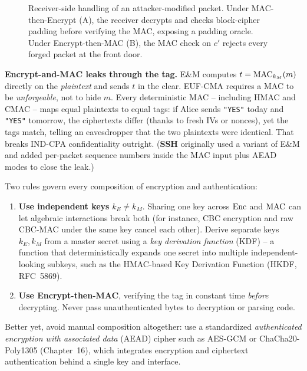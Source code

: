\begin{figure}[htbp]
\caption{Receiver-side handling of an attacker-modified packet. Under MAC-then-Encrypt (A), the receiver decrypts and checks block-cipher padding before verifying the MAC, exposing a padding oracle. Under Encrypt-then-MAC (B), the MAC check on $c'$ rejects every forged packet at the front door.}
\label{ch15:fig-mte-vs-etm-rx}
\end{figure}

\begin{attackbox}
\textbf{Encrypt-and-MAC leaks through the tag.} E\&M computes $t=\operatorname{MAC}_{k_M}(m)$ directly on the \emph{plaintext} and sends $t$ in the clear. EUF-CMA requires a MAC to be \emph{unforgeable}, not to hide $m$. Every deterministic MAC -- including HMAC and CMAC -- maps equal plaintexts to equal tags: if Alice sends \texttt{"YES"} today and \texttt{"YES"} tomorrow, the ciphertexts differ (thanks to fresh IVs or nonces), yet the tags match, telling an eavesdropper that the two plaintexts were identical. That breaks IND-CPA confidentiality outright. (\textbf{SSH} originally used a variant of E\&M and added per-packet sequence numbers inside the MAC input plus AEAD modes to close the leak.)
\end{attackbox}

\begin{trapbox}
Two rules govern every composition of encryption and authentication:
\begin{enumerate}
  \item \textbf{Use independent keys} $k_E\ne k_M$. Sharing one key across $\operatorname{Enc}$ and $\operatorname{MAC}$ can let algebraic interactions break both (for instance, CBC encryption and raw CBC-MAC under the same key cancel each other). Derive separate keys $k_E, k_M$ from a master secret using a \emph{key derivation function} (KDF) -- a function that deterministically expands one secret into multiple independent-looking subkeys, such as the HMAC-based Key Derivation Function (HKDF, RFC~5869).
  \item \textbf{Use Encrypt-then-MAC}, verifying the tag in constant time \emph{before} decrypting. Never pass unauthenticated bytes to decryption or parsing code.
\end{enumerate}
Better yet, avoid manual composition altogether: use a standardized \emph{authenticated encryption with associated data} (AEAD) cipher such as AES-GCM or ChaCha20-Poly1305 (Chapter~16), which integrates encryption and ciphertext authentication behind a single key and interface.
\end{trapbox}

